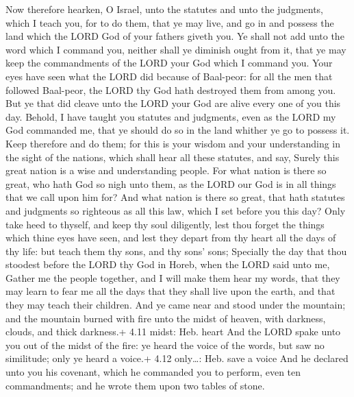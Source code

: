  Now therefore hearken, O Israel, unto the statutes and unto
the judgments, which I teach you, for to do them, that ye may live, and
go in and possess the land which the LORD God of your fathers giveth
you.  Ye shall not add unto the word which I command you,
neither shall ye diminish ought from it, that ye may keep the
commandments of the LORD your God which I command you.  Your
eyes have seen what the LORD did because of Baal-peor: for all the men
that followed Baal-peor, the LORD thy God hath destroyed them from among
you.  But ye that did cleave unto the LORD your God are
alive every one of you this day.  Behold, I have taught you
statutes and judgments, even as the LORD my God commanded me, that ye
should do so in the land whither ye go to possess it.  Keep
therefore and do them; for this is your wisdom and your understanding in
the sight of the nations, which shall hear all these statutes, and say,
Surely this great nation is a wise and understanding people.
 For what nation is there so great, who hath God so nigh
unto them, as the LORD our God is in all things that we call upon him
for?  And what nation is there so great, that hath statutes
and judgments so righteous as all this law, which I set before you this
day?  Only take heed to thyself, and keep thy soul
diligently, lest thou forget the things which thine eyes have seen, and
lest they depart from thy heart all the days of thy life: but teach them
thy sons, and thy sons' sons;  Specially the day that thou
stoodest before the LORD thy God in Horeb, when the LORD said unto me,
Gather me the people together, and I will make them hear my words, that
they may learn to fear me all the days that they shall live upon the
earth, and that they may teach their children.  And ye came
near and stood under the mountain; and the mountain burned with fire
unto the midst of heaven, with darkness, clouds, and thick darkness.+
4.11 midst: Heb. heart  And the LORD spake unto you out of
the midst of the fire: ye heard the voice of the words, but saw no
similitude; only ye heard a voice.+ 4.12 only\ldots: Heb. save a voice
 And he declared unto you his covenant, which he commanded
you to perform, even ten commandments; and he wrote them upon two tables
of stone.

